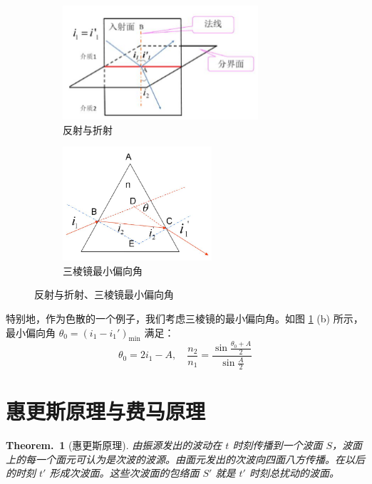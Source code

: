 \documentclass[UTF8]{report}
\theoremstyle{MyLineTheoremStyle} %
\newtheorem{LineTheorem}{Theorem.\,}
\theoremstyle{MyBlockTheoremStyle} %
\theoremstyle{MySubsubsectionStyle} %
\begin{document}
\begin{figure}[H]\centering
\begin{subfigure}[t]{0.5\columnwidth}\centering
    \includegraphics[height=120pt]{assets/1,2/image (44).jpg}
    \caption{ 反射与折射 }
\end{subfigure}\hfill
\begin{subfigure}[t]{0.5\columnwidth}\centering
    \includegraphics[height=120pt]{assets/1,2/image (45).jpg}
    \caption{ 三棱镜最小偏向角 }
\end{subfigure}
\caption{ 反射与折射、三棱镜最小偏向角 }\label{反射与折射、三棱镜最小偏向角}
\end{figure}



特别地，作为色散的一个例子，我们考虑三棱镜的最小偏向角。如图 \ref{反射与折射、三棱镜最小偏向角} (b) 所示，最小偏向角 $\theta_0 = (i_1 - i_1')_{\min}$ 满足：
\begin{equation}
    \theta_0 = 2i_1 - A, \quad \frac{n_2}{n_1} = \frac{\sin\frac{\theta_0+A}2}{\sin\frac A2}
\end{equation}



\section{惠更斯原理与费马原理}

\begin{LineTheorem}[惠更斯原理]\label{LineTheorem: 惠更斯原理}
    由振源发出的波动在 $t$ 时刻传播到一个波面 $S$，波面上的每一个面元可认为是次波的波源。由面元发出的次波向四面八方传播。在以后的时刻 $t'$ 形成次波面。这些次波面的包络面 $S'$ 就是 $t'$ 时刻总扰动的波面。
\end{LineTheorem}
\end{document}
